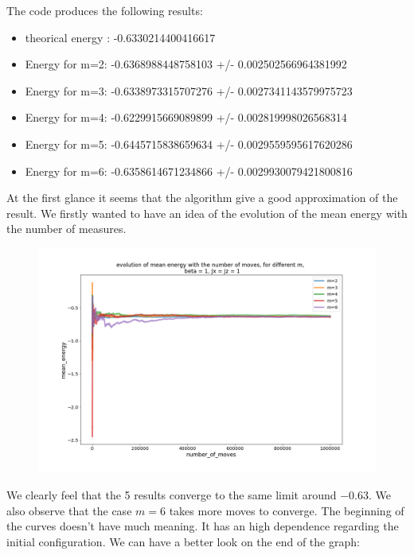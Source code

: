 \documentclass[a4paper,12pt]{article}
\begin{document}
	 The code produces the following results:
	 \begin{itemize}[label=$\star$]
	 	\item theorical energy : -0.6330214400416617
	 	\item Energy for m=2: -0.6368988448758103 +/- 0.002502566964381992
	 	\item Energy for m=3: -0.6338973315707276 +/- 0.0027341143579975723
	 	\item Energy for m=4: -0.6229915669089899 +/- 0.002819998026568314
	 	\item Energy for m=5: -0.6445715838659634 +/- 0.0029559595617620286
	 	\item Energy for m=6: -0.6358614671234866 +/- 0.0029930079421800816
	 \end{itemize}
	 
	 At the first glance it seems that the algorithm give a good approximation of the result. We firstly wanted to have an idea of the evolution of the mean energy with the number of measures.
	 \begin{figure}[H]
	 	\centering
	 	\includegraphics[scale=0.4]{meanenrgyevolution_x=z=1_m2-6.png}
	 	\label{energy mean evolution}			
	 \end{figure}
	 
	 We clearly feel that the 5 results converge to the same limit around $-0.63$. We also observe that the case $m = 6$ takes more moves to converge.
	 The beginning of the curves doesn't have much meaning. It has an high dependence regarding the initial configuration.
	 We can have a better look on the end of the graph:
	 
\end{document}
